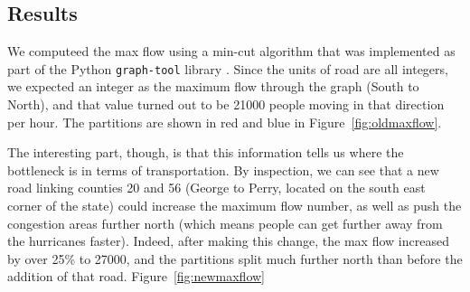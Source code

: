 \documentclass[titlepage]{article}
\begin{document}
  \subsection{Results}
  \par We computeed the max flow using a min-cut algorithm that was implemented as part of the Python \texttt{graph-tool} library \cite{graphtool}. Since the units of road are all integers, we expected an integer as the maximum flow through the graph (South to North), and that value turned out to be 21000 people moving in that direction per hour. The partitions are shown in red and blue in Figure~\ref{fig:oldmaxflow}.
  \par The interesting part, though, is that this information tells us where the bottleneck is in terms of transportation. By inspection, we can see that a new road linking counties 20 and 56 (George to Perry, located on the south east corner of the state) could increase the maximum flow number, as well as push the congestion areas further north (which means people can get further away from the hurricanes faster).
  Indeed, after making this change, the max flow increased by over 25\% to 27000, and the partitions split much further north than before the addition of that road. Figure~\ref{fig:newmaxflow}
\end{document}
